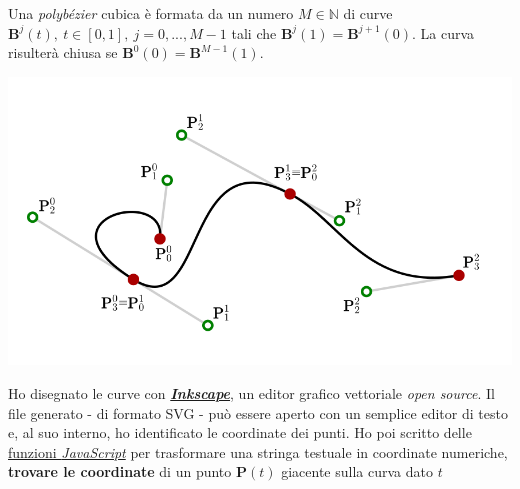 \documentclass[
]{book}
\begin{document}
Una \emph{polybézier} cubica è formata da un numero \(M \in \mathbb{N}\) di curve \(\mathbf{B}^j(t), \ t \in [0,1], \ j=0,...,M-1\) tali che \(\mathbf{B}^j(1)=\mathbf{B}^{j+1}(0)\). La curva risulterà chiusa se \(\mathbf{B}^0(0)=\mathbf{B}^{M-1}(1)\).

\begin{center}\includegraphics[width=0.75\linewidth]{_images/polybezier} \end{center}

Ho disegnato le curve con \href{https://inkscape.org/}{\emph{\textbf{Inkscape}}}, un editor grafico vettoriale \emph{open source}. Il file generato - di formato SVG - può essere aperto con un semplice editor di testo e, al suo interno, ho identificato le coordinate dei punti. Ho poi scritto delle \href{https://github.com/Bradwave/thesis/blob/master/animations/js/utils/polybezier.js}{funzioni \emph{JavaScript}} per trasformare una stringa testuale in coordinate numeriche, \textbf{trovare le coordinate} di un punto \(\mathbf{P}(t)\) giacente sulla curva dato \(t\)
\end{document}
